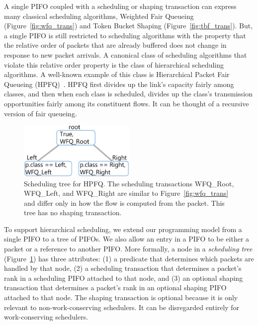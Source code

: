 A single PIFO coupled with a scheduling or shaping transaction can express many
classical scheduling algorithms, \eg Weighted Fair Queueing (Figure~\ref{fig:wfq_trans})
and Token Bucket Shaping (Figure~\ref{fig:tbf_trans}). But, a single PIFO is still restricted to
scheduling algorithms with the property that the relative order of packets that
are already buffered does not change in response to new packet arrivals. A
canonical class of scheduling algorithms that violate this relative order
property is the class of hierarchical scheduling algorithms. A well-known
example of this class is Hierarchical Packet Fair Queueing (HPFQ)~\cite{hpfq}.
HPFQ first divides up the link's capacity fairly among classes, and then when
each class is scheduled, divides up the class's transmission opportunities
fairly among its constituent flows. It can be thought of a recursive version of
fair queueing.

\begin{figure}[!t]
\centering
\includegraphics[width=0.5\textwidth]{pifo_hpfq_program.pdf}
\caption{Scheduling tree for HPFQ. The scheduling transactions WFQ\_Root,
WFQ\_Left, and WFQ\_Right are similar to Figure~\ref{fig:wfq_trans} and differ
only in how the flow is computed from the packet. This tree has no shaping
transaction.}
\label{fig:scheduling_tree}
\end{figure}

To support hierarchical scheduling, we extend our programming model from a
single PIFO to a tree of PIFOs. We also allow an entry in a PIFO to be either a
packet or a reference to another PIFO. More formally, a node in a {\em
scheduling tree} (Figure~\ref{fig:scheduling_tree}) has three attributes: (1) a
predicate that determines which packets are handled by that node, (2) a
scheduling transaction that determines a packet's rank in a scheduling PIFO
attached to that node, and (3) an optional shaping transaction that determines
a packet's rank in an optional shaping PIFO attached to that node. The shaping
transaction is optional because it is only relevant to non-work-conserving
schedulers. It can be disregarded entirely for work-conserving schedulers.

